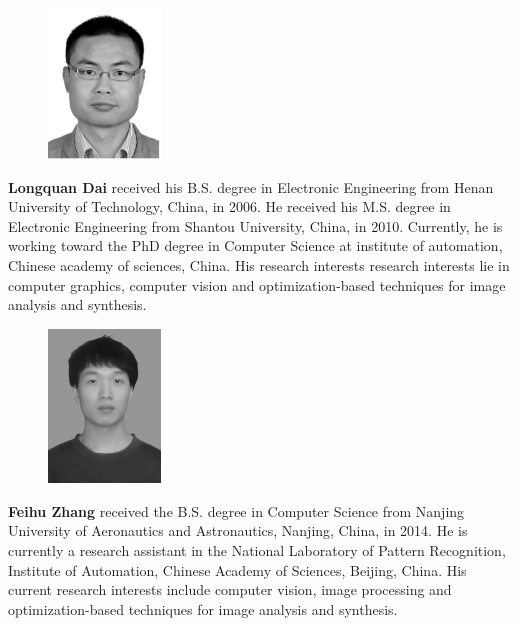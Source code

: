 \documentclass[preprint,10pt,5p,times,twocolumn]{elsarticle}
\begin{document}

%
%






\begin{figure}
\includegraphics [width=3cm,clip]{dai.pdf}
\end{figure}
\textbf{Longquan Dai} received his B.S. degree in Electronic Engineering from Henan University of Technology, China, in 2006. He received his M.S. degree in Electronic Engineering from Shantou University, China, in 2010. Currently, he is working toward the PhD degree in Computer Science  at institute of automation, Chinese academy of sciences, China. His research interests research interests lie in computer graphics, computer vision and optimization-based techniques for image analysis and synthesis.

\begin{figure}
\includegraphics [width=3cm,clip]{zhang.png}
\end{figure}
\textbf{Feihu Zhang}  received the B.S. degree in
Computer Science from Nanjing University of Aeronautics and Astronautics, Nanjing, China, in 2014.
He is currently a research assistant in the National Laboratory of Pattern Recognition, Institute of Automation, Chinese Academy of Sciences, Beijing, China. His current research interests include computer vision, image processing and optimization-based techniques for image analysis and synthesis.
\end{document}
